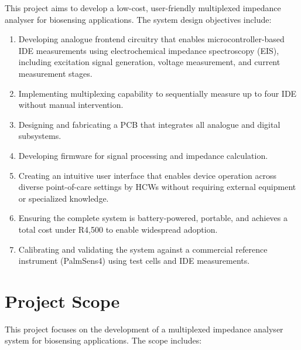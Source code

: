 This project aims to develop a low-cost, user-friendly multiplexed impedance analyser for biosensing applications. The system design objectives include:

\begin{enumerate}
    \item Developing analogue frontend circuitry that enables microcontroller-based \ac{IDE} measurements using electrochemical impedance spectroscopy (EIS), including excitation signal generation, voltage measurement, and current measurement stages.
    \item Implementing multiplexing capability to sequentially measure up to four \ac{IDE} without manual intervention.
    \item Designing and fabricating a \ac{PCB} that integrates all analogue and digital subsystems.
    \item Developing firmware for signal processing and impedance calculation.
    \item Creating an intuitive user interface that enables device operation across diverse point-of-care settings by \acp{HCW} without requiring external equipment or specialized knowledge.
    \item Ensuring the complete system is battery-powered, portable, and achieves a total cost under R4,500 to enable widespread adoption.
    \item Calibrating and validating the system against a commercial reference instrument (PalmSens4) using test cells and \ac{IDE} measurements.
\end{enumerate}

\section{Project Scope}

This project focuses on the development of a multiplexed impedance analyser system for biosensing applications. The scope includes:

